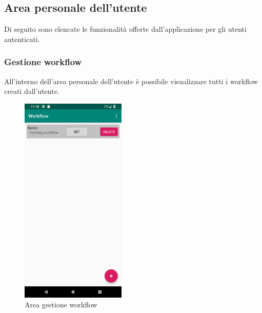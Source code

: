\subsection{Area personale dell'utente}
\label{sec:sec_area_personale_utente}
Di seguito sono elencate le funzionalità offerte dall'applicazione per gli utenti autenticati.
\subsubsection{Gestione workflow}
All'interno dell'area personale dell'utente è possibile visualizzare tutti i workflow creati dall'utente.
\begin{figure}[H]
	\centering
	\includegraphics[width=5cm]{../includes/pics/area_workflow_utente.png}
	\caption{\label{fig:area_workflow_utente}Area gestione workflow}
\end{figure}
\pagebreak
